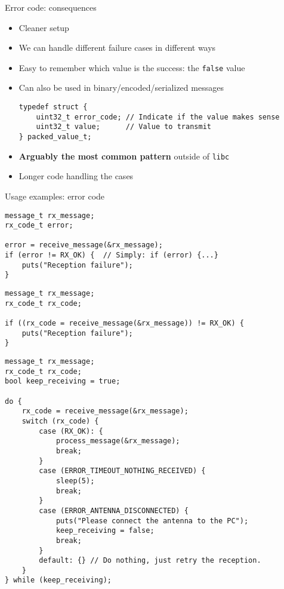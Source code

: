 \documentclass[aspectratio=169,14pt]{beamer}
\begin{document}
\begin{frame}[fragile]{Error code: consequences}
\begin{itemize}
    \item[\good] Cleaner setup
    \item[\good] We can handle different failure cases in different ways
    \item[\good] Easy to remember which value is the success: the \texttt{false} value
    \item[\good] Can also be used in binary/encoded/serialized messages
                 \begin{small}
\begin{lstlisting}[style=cstyle]
typedef struct {
    uint32_t error_code; // Indicate if the value makes sense
    uint32_t value;      // Value to transmit
} packed_value_t;
\end{lstlisting}
                 \end{small}
    \item[\good] \textbf{Arguably the most common pattern} outside of \texttt{libc}
    \item[\bad] Longer code handling the cases
\end{itemize}
\end{frame}



\begin{frame}[fragile]{Usage examples: error code}
\begin{lstlisting}[style=cstyle]
message_t rx_message;
rx_code_t error;

error = receive_message(&rx_message);
if (error != RX_OK) {  // Simply: if (error) {...}
    puts("Reception failure");
}
\end{lstlisting}

\begin{lstlisting}[style=cstyle]
message_t rx_message;
rx_code_t rx_code;

if ((rx_code = receive_message(&rx_message)) != RX_OK) {
    puts("Reception failure");
}
\end{lstlisting}
\end{frame}



\begin{frame}[fragile]{}
\begin{lstlisting}[style=cstyle,basicstyle=\scriptsize\ttfamily]
message_t rx_message;
rx_code_t rx_code;
bool keep_receiving = true;

do {
    rx_code = receive_message(&rx_message);
    switch (rx_code) {
        case (RX_OK): {
            process_message(&rx_message);
            break;
        }
        case (ERROR_TIMEOUT_NOTHING_RECEIVED) {
            sleep(5);
            break;
        }
        case (ERROR_ANTENNA_DISCONNECTED) {
            puts("Please connect the antenna to the PC");
            keep_receiving = false;
            break;
        }
        default: {} // Do nothing, just retry the reception.
    }
} while (keep_receiving);
\end{lstlisting}
\end{frame}
\end{document}
